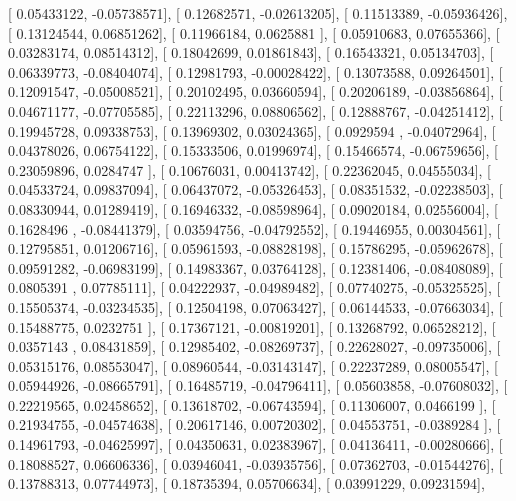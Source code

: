 \documentclass{article}
\begin{document}
       [ 0.05433122, -0.05738571],
       [ 0.12682571, -0.02613205],
       [ 0.11513389, -0.05936426],
       [ 0.13124544,  0.06851262],
       [ 0.11966184,  0.0625881 ],
       [ 0.05910683,  0.07655366],
       [ 0.03283174,  0.08514312],
       [ 0.18042699,  0.01861843],
       [ 0.16543321,  0.05134703],
       [ 0.06339773, -0.08404074],
       [ 0.12981793, -0.00028422],
       [ 0.13073588,  0.09264501],
       [ 0.12091547, -0.05008521],
       [ 0.20102495,  0.03660594],
       [ 0.20206189, -0.03856864],
       [ 0.04671177, -0.07705585],
       [ 0.22113296,  0.08806562],
       [ 0.12888767, -0.04251412],
       [ 0.19945728,  0.09338753],
       [ 0.13969302,  0.03024365],
       [ 0.0929594 , -0.04072964],
       [ 0.04378026,  0.06754122],
       [ 0.15333506,  0.01996974],
       [ 0.15466574, -0.06759656],
       [ 0.23059896,  0.0284747 ],
       [ 0.10676031,  0.00413742],
       [ 0.22362045,  0.04555034],
       [ 0.04533724,  0.09837094],
       [ 0.06437072, -0.05326453],
       [ 0.08351532, -0.02238503],
       [ 0.08330944,  0.01289419],
       [ 0.16946332, -0.08598964],
       [ 0.09020184,  0.02556004],
       [ 0.1628496 , -0.08441379],
       [ 0.03594756, -0.04792552],
       [ 0.19446955,  0.00304561],
       [ 0.12795851,  0.01206716],
       [ 0.05961593, -0.08828198],
       [ 0.15786295, -0.05962678],
       [ 0.09591282, -0.06983199],
       [ 0.14983367,  0.03764128],
       [ 0.12381406, -0.08408089],
       [ 0.0805391 ,  0.07785111],
       [ 0.04222937, -0.04989482],
       [ 0.07740275, -0.05325525],
       [ 0.15505374, -0.03234535],
       [ 0.12504198,  0.07063427],
       [ 0.06144533, -0.07663034],
       [ 0.15488775,  0.0232751 ],
       [ 0.17367121, -0.00819201],
       [ 0.13268792,  0.06528212],
       [ 0.0357143 ,  0.08431859],
       [ 0.12985402, -0.08269737],
       [ 0.22628027, -0.09735006],
       [ 0.05315176,  0.08553047],
       [ 0.08960544, -0.03143147],
       [ 0.22237289,  0.08005547],
       [ 0.05944926, -0.08665791],
       [ 0.16485719, -0.04796411],
       [ 0.05603858, -0.07608032],
       [ 0.22219565,  0.02458652],
       [ 0.13618702, -0.06743594],
       [ 0.11306007,  0.0466199 ],
       [ 0.21934755, -0.04574638],
       [ 0.20617146,  0.00720302],
       [ 0.04553751, -0.0389284 ],
       [ 0.14961793, -0.04625997],
       [ 0.04350631,  0.02383967],
       [ 0.04136411, -0.00280666],
       [ 0.18088527,  0.06606336],
       [ 0.03946041, -0.03935756],
       [ 0.07362703, -0.01544276],
       [ 0.13788313,  0.07744973],
       [ 0.18735394,  0.05706634],
       [ 0.03991229,  0.09231594],
\end{document}
